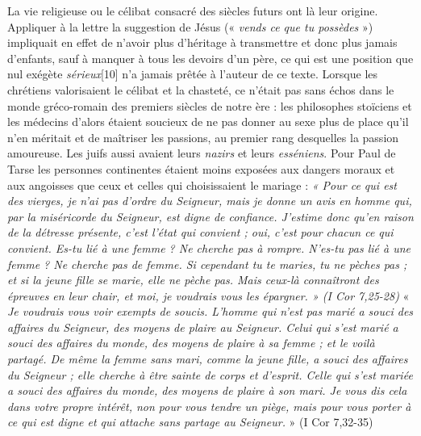  La vie religieuse ou le célibat consacré des siècles futurs ont là leur origine. Appliquer à la lettre la suggestion de Jésus (« \emph{vends ce que tu possèdes} ») impliquait en effet de n'avoir plus d'héritage à transmettre et donc plus jamais d'enfants, sauf à manquer à tous les devoirs d'un père, ce qui est une position que nul exégète \emph{sérieux}[10] n'a jamais prêtée à l'auteur de ce texte. 
 Lorsque les chrétiens valorisaient le célibat et la chasteté, ce n'était pas sans échos dans le monde gréco-romain des premiers siècles de notre ère : les philosophes stoïciens et les médecins d'alors étaient soucieux de ne pas donner au sexe plus de place qu'il n'en méritait et de maîtriser les passions, au premier rang desquelles la passion amoureuse. Les juifs aussi avaient leurs \emph{nazirs} et leurs \emph{esséniens}. 
 Pour Paul de Tarse les personnes continentes étaient moins exposées aux dangers moraux et aux angoisses que ceux et celles qui choisissaient le mariage : \emph{« Pour ce qui est des vierges, je n'ai pas d'ordre du Seigneur, mais je donne un avis en homme qui, par la miséricorde du Seigneur, est digne de confiance. J'estime donc qu'en raison de la détresse présente, c'est l'état qui convient ; oui, c'est pour chacun ce qui convient. Es-tu lié à une femme ? Ne cherche pas à rompre. N'es-tu pas lié à une femme ? Ne cherche pas de femme. Si cependant tu te maries, tu ne pèches pas ; et si la jeune fille se marie, elle ne pèche pas. Mais ceux-là connaîtront des épreuves en leur chair, et moi, je voudrais vous les épargner. » (I Cor 7,25-28)}
 « \emph{Je voudrais vous voir exempts de soucis. L'homme qui n'est pas marié a souci des affaires du Seigneur, des moyens de plaire au Seigneur. Celui qui s'est marié a souci des affaires du monde, des moyens de plaire à sa femme ; et le voilà partagé. De même la femme sans mari, comme la jeune fille, a souci des affaires du Seigneur ; elle cherche à être sainte de corps et d'esprit. Celle qui s'est mariée a souci des affaires du monde, des moyens de plaire à son mari. Je vous dis cela dans votre propre intérêt, non pour vous tendre un piège, mais pour vous porter à ce qui est digne et qui attache sans partage au Seigneur.} » (I Cor 7,32-35)

